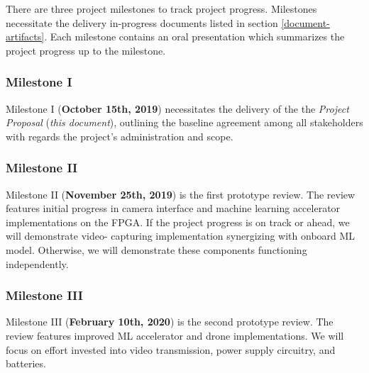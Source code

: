 There are three project milestones to track project progress.
Milestones necessitate the delivery in-progress documents listed
in section \ref{document-artifacts}. Each milestone contains an oral
presentation which summarizes the project progress up to the milestone.

\subsubsection{Milestone I}
Milestone I (\textbf{October 15th, 2019}) necessitates the delivery of the
the \textit{Project Proposal} (\textit{this document}), outlining
the baseline agreement among all stakeholders with 
regards the project's administration and scope.

\subsubsection{Milestone II}
Milestone II (\textbf{November 25th, 2019}) is the first prototype review. 
The review features initial progress in camera interface
and machine learning accelerator implementations on the FPGA.
If the project progress is on track or ahead, we will demonstrate video-
capturing implementation synergizing with onboard ML model. Otherwise, we will
demonstrate these components functioning independently.

\subsubsection{Milestone III}
Milestone III (\textbf{February 10th, 2020}) is the second prototype review.
The review features improved ML accelerator and drone implementations. We will
focus on effort invested into video transmission, power supply circuitry, 
and batteries.
